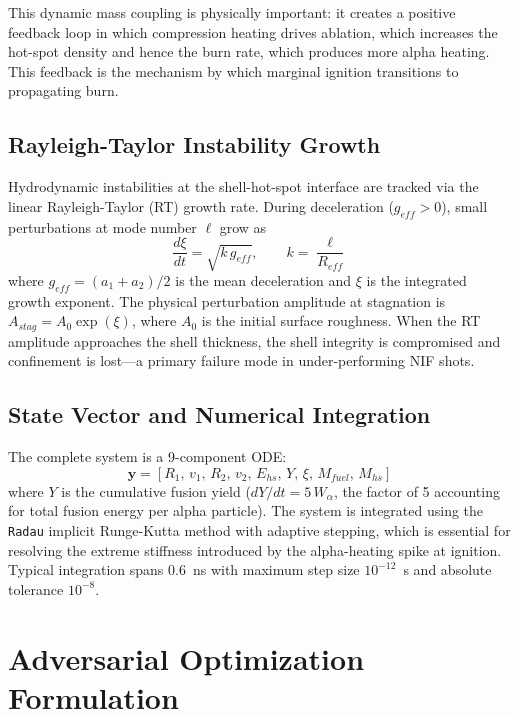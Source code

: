 \documentclass[conference]{IEEEtran}
\begin{document}
This dynamic mass coupling is physically important: it creates a positive feedback loop in which compression heating drives ablation, which increases the hot-spot density and hence the burn rate, which produces more alpha heating.  This feedback is the mechanism by which marginal ignition transitions to propagating burn.

\subsection{Rayleigh-Taylor Instability Growth}

Hydrodynamic instabilities at the shell-hot-spot interface are tracked via the linear Rayleigh-Taylor (RT) growth rate.  During deceleration ($g_{eff} > 0$), small perturbations at mode number $\ell$ grow as
\begin{equation}
\frac{d\xi}{dt} = \sqrt{k \, g_{eff}}, \qquad k = \frac{\ell}{R_{eff}}
\label{eq:rt}
\end{equation}
where $g_{eff} = (a_1 + a_2)/2$ is the mean deceleration and $\xi$ is the integrated growth exponent.  The physical perturbation amplitude at stagnation is $A_{stag} = A_0 \exp(\xi)$, where $A_0$ is the initial surface roughness.  When the RT amplitude approaches the shell thickness, the shell integrity is compromised and confinement is lost---a primary failure mode in under-performing NIF shots.

\subsection{State Vector and Numerical Integration}

The complete system is a 9-component ODE:
\begin{equation}
\mathbf{y} = \left[R_1,\, v_1,\, R_2,\, v_2,\, E_{hs},\, Y,\, \xi,\, M_{fuel},\, M_{hs}\right]
\label{eq:state}
\end{equation}
where $Y$ is the cumulative fusion yield ($dY/dt = 5\,W_\alpha$, the factor of 5 accounting for total fusion energy per alpha particle).  The system is integrated using the \texttt{Radau} implicit Runge-Kutta method \cite{hairer1996} with adaptive stepping, which is essential for resolving the extreme stiffness introduced by the alpha-heating spike at ignition.  Typical integration spans 0.6~ns with maximum step size $10^{-12}$~s and absolute tolerance $10^{-8}$.

\section{Adversarial Optimization Formulation}
\label{sec:optimization}
\end{document}
